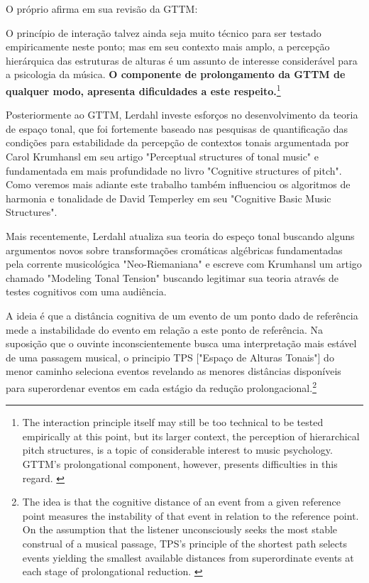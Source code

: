 \documentclass[
	12pt,				%
	openright,			%
	twoside,			%
	a4paper,			%
	english,			%
	french,				%
	spanish,			%
	brazil				%
	]{abntex2}
\begin{document}
O próprio  afirma em sua revisão da GTTM:


\begin{citacao}
O princípio de interação talvez ainda seja muito técnico para ser testado empiricamente neste ponto; mas em seu contexto mais amplo, a percepção hierárquica das estruturas de alturas é um assunto de interesse considerável para a psicologia da música.\textbf{ O componente de prolongamento da GTTM de qualquer modo, apresenta dificuldades a este respeito.}\cite[p. 191]{lerdahl2009genesis}\footnote{ The interaction principle itself may still be too technical to be tested empirically at this point, but its larger
context, the perception of hierarchical pitch structures, is a topic of considerable interest to music psychology. GTTM’s prolongational component, however, presents
difficulties in this regard. \cite[p. 191]{lerdahl2009genesis}}
\end{citacao}



Posteriormente ao GTTM, Lerdahl investe esforços no desenvolvimento da teoria de espaço tonal\cite{lerdahl1988tps}, que foi fortemente baseado nas pesquisas de quantificação das condições para estabilidade da percepção de contextos tonais argumentada por Carol Krumhansl em seu artigo "Perceptual structures of tonal music"\cite{krumhansl1983perceptual} e fundamentada em mais profundidade no livro "Cognitive structures of pitch"\cite{krumhansl1990cognitive}. Como veremos mais adiante este trabalho também influenciou os algoritmos de harmonia e tonalidade de David Temperley em seu "Cognitive Basic Music Structures"\cite{temperley2004cognition}. 

\pagebreak
Mais recentemente, Lerdahl atualiza sua teoria do espeço tonal\cite{lerdahl2001tonal} buscando alguns argumentos novos sobre transformações cromáticas algébricas fundamentadas pela corrente musicológica "Neo-Riemaniana"\cite{cohn1998introduction,lewin2007generalized} e escreve com Krumhansl um artigo chamado "Modeling Tonal Tension"\cite{2007lerdahl-krumhansl} buscando legitimar sua teoria através de testes cognitivos com uma audiência.

\begin{citacao}
A ideia é que a distância cognitiva de um evento de um ponto dado de referência mede a instabilidade do evento em relação a este ponto de referência. Na suposição que o ouvinte inconscientemente busca uma interpretação mais estável de uma passagem musical, o principio TPS ["Espaço de Alturas Tonais"] do menor caminho seleciona eventos revelando as menores distâncias disponíveis para superordenar eventos em cada estágio da redução prolongacional.\cite[p. 191]{lerdahl2009genesis}\footnote{The idea is that the cognitive distance of an event from a given reference point measures the instability of that
event in relation to the reference point. On the assumption that the listener unconsciously seeks the most stable construal of a musical passage, TPS’s principle of
the shortest path selects events yielding the smallest available distances from superordinate events at each stage of prolongational reduction. \cite[p. 191]{lerdahl2009genesis}}
\end{citacao}
\end{document}
